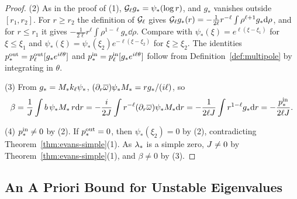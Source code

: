 \begin{proof}
(2) As in the proof of (1), $\mathcal{G}_\ell g_*=\psi_*(\log r)$, and $g_*$ vanishes
outside $[r_1,r_2]$. For $r\ge r_2$ the definition of $\mathcal{G}_\ell$ gives
$\mathcal{G}_\ell g_*(r)=-\frac1{2\ell}r^{-\ell}\int\rho^{\ell+1}g_*\dd\rho$, and for $r\le r_1$
it gives $-\frac1{2\ell}r^\ell\int\rho^{1-\ell}g_*\dd\rho$. Compare with
$\psi_*(\xi)=e^{\ell(\xi-\xi_1)}$ for $\xi\le\xi_1$ and
$\psi_*(\xi)=\psi_*(\xi_2)e^{-\ell(\xi-\xi_2)}$ for $\xi\ge\xi_2$. The identities
$p^{\mathrm{out}}_*=p^{\mathrm{out}}_\ell[g_*e^{i\ell\theta}]$ and $p^{\mathrm{in}}_*=p^{\mathrm{in}}_\ell[g_*e^{i\ell\theta}]$
follow from Definition~\ref{def:multipole} by integrating in $\theta$.

(3) From $g_*=M_*k_\ell\psi_*$, $(\partial_r\overline{\omega})\psi_*M_*=rg_*/(i\ell)$, so
\[
\beta=\frac{1}{J}\int b\,\psi_*M_*\,r\dd r=-\frac{i}{2J}\int r^{-\ell}(\partial_r\overline{\omega})\psi_*M_*\dd r
=-\frac{1}{2\ell J}\int r^{1-\ell}g_*\dd r=-\frac{p^{\mathrm{in}}_*}{2\ell J}.
\]

(4) $p^{\mathrm{in}}_*\ne0$ by (2). If $p^{\mathrm{out}}_*=0$, then $\psi_*(\xi_2)=0$ by (2),
contradicting Theorem~\ref{thm:evans-simple}(1). As $\lambda_*$ is a simple zero, $J\ne0$ by
Theorem~\ref{thm:evans-simple}(1), and $\beta\ne0$ by (3).
\end{proof}

\subsection{An A Priori Bound for Unstable Eigenvalues}

